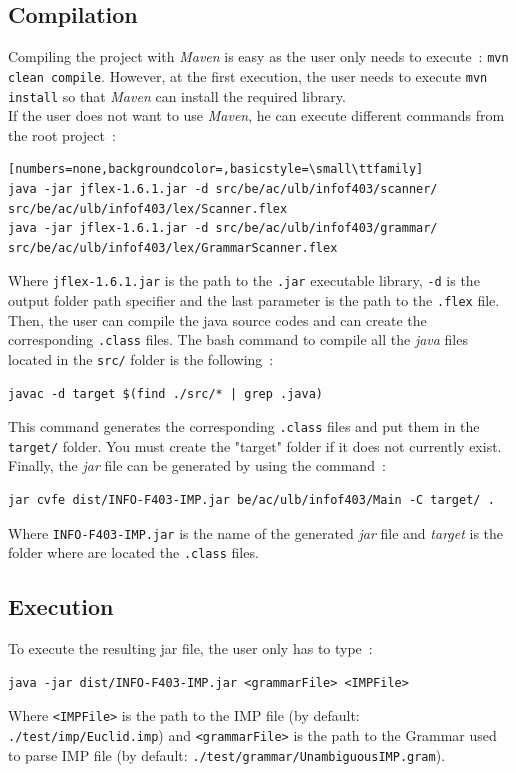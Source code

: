 \documentclass[a4paper,11pt]{article}
\begin{document}
  \subsection{Compilation}
    Compiling the project with \textit{Maven} is easy as the user only needs to execute~: \verb|mvn clean compile|. However, at the first execution, the user needs to execute \verb|mvn install| so that \textit{Maven} can install the required library.\\
    If the user does not want to use \textit{Maven}, he can execute different commands from the root project~:
    \begin{lstlisting}[numbers=none,backgroundcolor=,basicstyle=\small\ttfamily]
java -jar jflex-1.6.1.jar -d src/be/ac/ulb/infof403/scanner/ src/be/ac/ulb/infof403/lex/Scanner.flex
java -jar jflex-1.6.1.jar -d src/be/ac/ulb/infof403/grammar/ src/be/ac/ulb/infof403/lex/GrammarScanner.flex
    \end{lstlisting}
    Where \verb|jflex-1.6.1.jar| is the path to the \verb|.jar| executable library,  \verb|-d| is the output folder path specifier and the last parameter is the path to the \verb|.flex| file.\\
    Then, the user can compile the java source codes and can create the corresponding \verb|.class| files. The bash command to compile all the \textit{java} files located in the \verb|src/| folder is the following~:
    \begin{verbatim}
javac -d target $(find ./src/* | grep .java)
    \end{verbatim}
    This command generates the corresponding \verb|.class| files and put them in the \verb|target/| folder. You must create the "target" folder if it does not currently exist. Finally, the \textit{jar} file can be generated by using the command~:
    \begin{verbatim}
jar cvfe dist/INFO-F403-IMP.jar be/ac/ulb/infof403/Main -C target/ .
    \end{verbatim}
    Where \verb|INFO-F403-IMP.jar| is the name of the generated \textit{jar} file and \textit{target} is the folder where are located the \verb|.class| files.
    
  \subsection{Execution}
    To execute the resulting jar file, the user only has to type~:
    \begin{verbatim}
java -jar dist/INFO-F403-IMP.jar <grammarFile> <IMPFile>
    \end{verbatim}
    Where \verb|<IMPFile>| is the path to the IMP file (by default: \verb|./test/imp/Euclid.imp|) and \verb|<grammarFile>| is the path to the Grammar used to parse IMP file (by default: \verb|./test/grammar/UnambiguousIMP.gram|).
    
\end{document}
